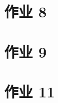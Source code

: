 \documentclass[\ROOT/main.tex]{subfiles}
\begin{document}
\section{作业 8}

\section{作业 9}

\section{作业 11}

\end{document}
